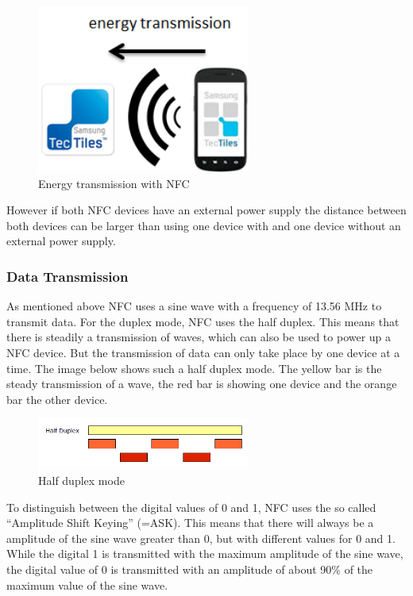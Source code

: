 \documentclass[11pt]{article}
\begin{document}
\begin{figure}[H]

 \centering
 \includegraphics [width=7cm]{smartphone_nfctag.png} %
 \caption{Energy transmission with NFC}
\end{figure}

However if both NFC devices have an external power supply the distance between both devices can be larger than using one device with and one device without an external power supply.

\subsubsection{Data Transmission}

As mentioned above NFC uses a sine wave with a frequency of 13.56 MHz to transmit data. For the duplex mode, NFC uses the half duplex. This means that there is steadily a transmission of waves, which can also be used to power up a NFC device. But the transmission of data can only take place by one device at a time. The image below shows such a half duplex mode. The yellow bar is the steady transmission of a wave, the red bar is showing one device and the orange bar the other device.

\begin{figure}[H]

 \centering
 \includegraphics [width=7cm]{HalfDuplex.png} %
 \caption{Half duplex mode\cite{cite4}}
\end{figure}

To distinguish between the digital values of 0 and 1, NFC uses the so called "`Amplitude Shift Keying"' (=ASK). This means that there will always be a amplitude of the sine wave greater than 0, but with different values for 0 and 1. While the digital 1 is transmitted with the maximum amplitude of the sine wave, the digital value of 0 is transmitted with an amplitude of about 90\% of the maximum value of the sine wave.
\end{document}
